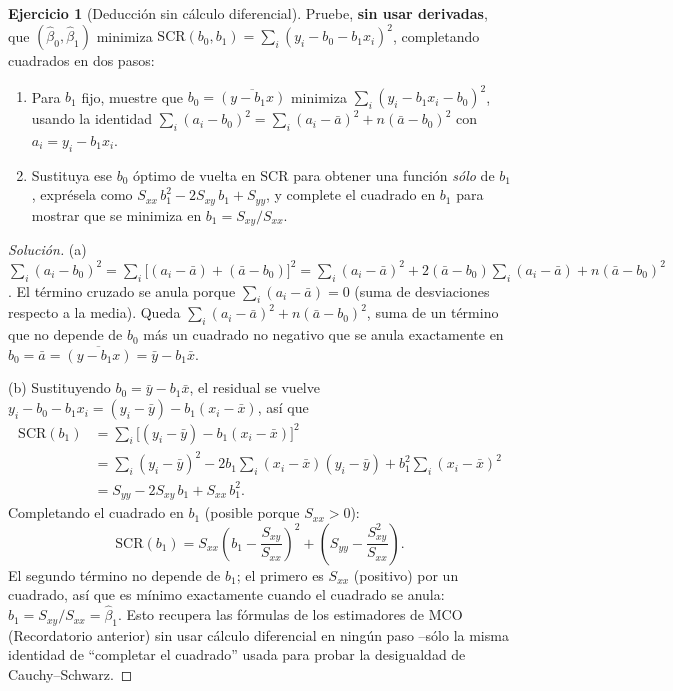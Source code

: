 \documentclass[11pt,a4paper,oneside]{article}
\theoremstyle{plain}
\theoremstyle{definition}
\newtheorem{exercise}[teorema]{Ejercicio}
\newcommand{\SCR}{\mathrm{SCR}}
\begin{document}
\begin{exercise}[Deducción sin cálculo diferencial]\label{ej:sin-calculo}
Pruebe, \textbf{sin usar derivadas}, que $(\hat\beta_0,\hat\beta_1)$
minimiza $\SCR(b_0,b_1)=\sum_i(y_i-b_0-b_1x_i)^2$, completando cuadrados
en dos pasos:
\begin{enumerate}[nosep,leftmargin=1.8em,label=(\alph*)]
  \item Para $b_1$ fijo, muestre que $b_0=\overline{(y-b_1x)}$ minimiza
  $\sum_i(y_i-b_1x_i-b_0)^2$, usando la identidad
  $\sum_i(a_i-b_0)^2 = \sum_i(a_i-\bar a)^2+n(\bar a-b_0)^2$ con
  $a_i=y_i-b_1x_i$.
  \item Sustituya ese $b_0$ óptimo de vuelta en $\SCR$ para obtener una
  función \emph{sólo} de $b_1$, exprésela como
  $S_{xx}\,b_1^2-2S_{xy}\,b_1+S_{yy}$, y complete el cuadrado en $b_1$
  para mostrar que se minimiza en $b_1=S_{xy}/S_{xx}$.
\end{enumerate}
\end{exercise}
\begin{proof}[Solución]
(a) $\sum_i(a_i-b_0)^2 = \sum_i\big[(a_i-\bar a)+(\bar a-b_0)\big]^2
= \sum_i(a_i-\bar a)^2 + 2(\bar a-b_0)\sum_i(a_i-\bar a) + n(\bar a-b_0)^2$.
El término cruzado se anula porque $\sum_i(a_i-\bar a)=0$ (suma de
desviaciones respecto a la media). Queda
$\sum_i(a_i-\bar a)^2+n(\bar a-b_0)^2$, suma de un término que no
depende de $b_0$ más un cuadrado no negativo que se anula exactamente en
$b_0=\bar a=\overline{(y-b_1x)}=\bar y-b_1\bar x$.

(b) Sustituyendo $b_0=\bar y-b_1\bar x$, el residual se vuelve
$y_i-b_0-b_1x_i = (y_i-\bar y)-b_1(x_i-\bar x)$, así que
\begin{align*}
  \SCR(b_1) &= \sum_i\big[(y_i-\bar y)-b_1(x_i-\bar x)\big]^2 \\
  &= \sum_i(y_i-\bar y)^2 - 2b_1\sum_i(x_i-\bar x)(y_i-\bar y)
     + b_1^2\sum_i(x_i-\bar x)^2 \\
  &= S_{yy} - 2S_{xy}\,b_1 + S_{xx}\,b_1^2 .
\end{align*}
Completando el cuadrado en $b_1$ (posible porque $S_{xx}>0$):
\[
  \SCR(b_1) = S_{xx}\left(b_1-\frac{S_{xy}}{S_{xx}}\right)^{\!2}
  + \left(S_{yy}-\frac{S_{xy}^2}{S_{xx}}\right).
\]
El segundo término no depende de $b_1$; el primero es
$S_{xx}$ (positivo) por un cuadrado, así que es mínimo exactamente
cuando el cuadrado se anula: $b_1=S_{xy}/S_{xx}=\hat\beta_1$. Esto
recupera las fórmulas de los estimadores de MCO (Recordatorio anterior)
sin usar cálculo diferencial en ningún paso --sólo la misma identidad de
``completar el cuadrado'' usada para probar la desigualdad de
Cauchy--Schwarz.
\end{proof}
\end{document}
